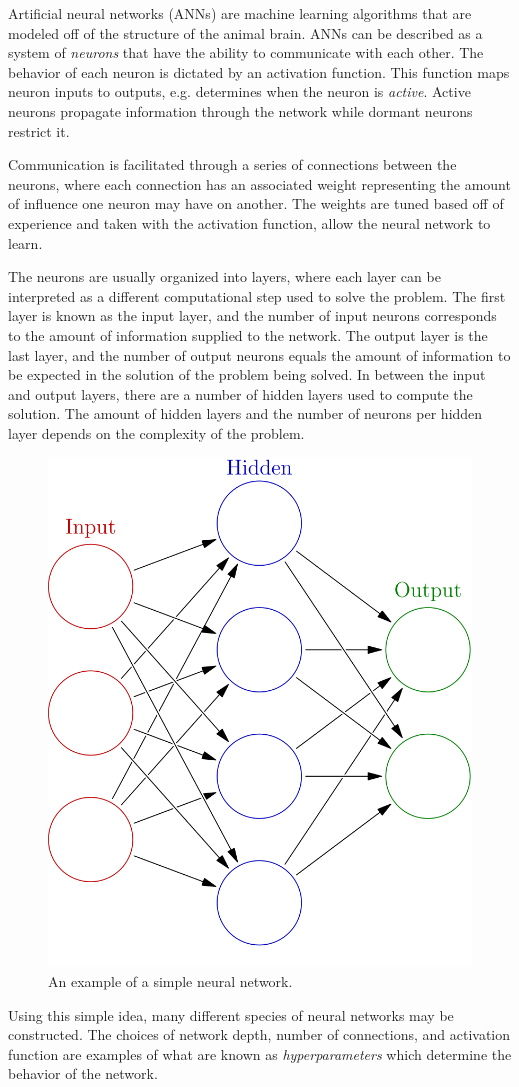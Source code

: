 \documentclass[twoside]{article}
\begin{document}
\begin{multicols}{2}
Artificial neural networks (ANNs) are machine learning algorithms that are modeled off of the structure of the animal brain. ANNs can be described as a system of \textit{neurons} that have the ability to communicate with each other. The behavior of each neuron is dictated by an activation function. This function maps neuron inputs to outputs, e.g. determines when the neuron is \textit{active}. Active neurons propagate information through the network while dormant neurons restrict it.  \par Communication is facilitated through a series of connections between the neurons, where each connection has an associated weight representing the amount of influence one neuron may have on another. The weights are tuned based off of experience and taken with the activation function, allow the neural network to learn. \par The neurons are usually organized into layers, where each layer can be interpreted as a different computational step used to solve the problem. The first layer is known as the input layer, and the number of input neurons corresponds to the amount of information supplied to the network. The output layer is the last layer, and the number of output neurons equals the amount of information to be expected in the solution of the problem being solved. In between the input and output layers, there are a number of hidden layers used to compute the solution. The amount of hidden layers and the number of neurons per hidden layer depends on the complexity of the problem.
\begin{figure}[H]
	\centering
	\includegraphics[width=0.5\linewidth]{images/neural}
	\caption{An example of a simple neural network.}
\end{figure}
Using this simple idea, many different species of neural networks may be constructed. The choices of network depth, number of connections, and activation function are examples of what are known as \textit{hyperparameters} which determine the behavior of the network.


\end{multicols}
\end{document}
